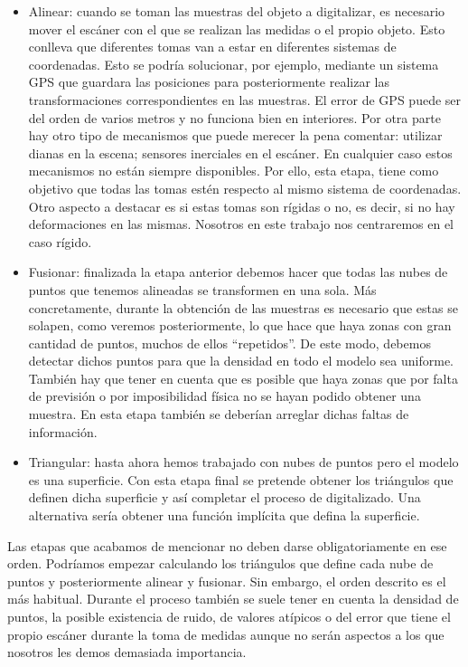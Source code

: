 \begin{itemize}
	\item Alinear: cuando se toman las muestras del objeto a digitalizar, es necesario mover el escáner con el que se realizan las medidas o el propio objeto. Esto conlleva que diferentes tomas van a estar en diferentes sistemas de coordenadas. Esto se podría solucionar, por ejemplo, mediante un sistema GPS que guardara las posiciones para posteriormente realizar las transformaciones correspondientes en las muestras. El error de GPS puede ser del orden de varios metros y no funciona bien en interiores. Por otra parte hay otro tipo de mecanismos que puede merecer la pena comentar: utilizar dianas en la escena; sensores inerciales en el escáner. En cualquier caso estos mecanismos no están siempre disponibles. Por ello, esta etapa, tiene como objetivo que todas las tomas estén respecto al mismo sistema de coordenadas. Otro aspecto a destacar es si 
	estas tomas son rígidas o no, es decir, si no hay deformaciones en las mismas. Nosotros en este trabajo nos centraremos en el caso rígido. 
	
	\item Fusionar: finalizada la etapa anterior debemos hacer que todas las nubes de puntos que tenemos alineadas se transformen en una sola. Más concretamente, durante la obtención de las muestras es necesario que estas se solapen, como veremos posteriormente, lo que hace que haya zonas con gran cantidad de puntos, muchos de ellos ``repetidos''. De este modo, debemos detectar dichos puntos para que la densidad en todo el modelo sea uniforme. También hay que tener en cuenta que es posible que haya zonas que por falta de previsión o por imposibilidad física no se hayan podido obtener una muestra. En esta etapa también se deberían arreglar dichas faltas de información. 
	\item Triangular: hasta ahora hemos trabajado con nubes de puntos pero el modelo es una superficie. Con esta etapa final se pretende obtener los triángulos que definen dicha superficie y así completar el proceso de digitalizado. Una alternativa sería obtener una función implícita que defina la superficie.
\end{itemize}

Las etapas que acabamos de mencionar no deben darse obligatoriamente en ese orden. Podríamos empezar calculando los triángulos que define cada nube de puntos y posteriormente alinear y fusionar. Sin embargo, el orden descrito es el más habitual. Durante el proceso también se suele tener en cuenta la densidad de puntos, la posible existencia de ruido, de valores atípicos o del error que tiene el propio escáner durante la toma de medidas aunque no serán aspectos a los que nosotros les demos demasiada importancia.  \\

